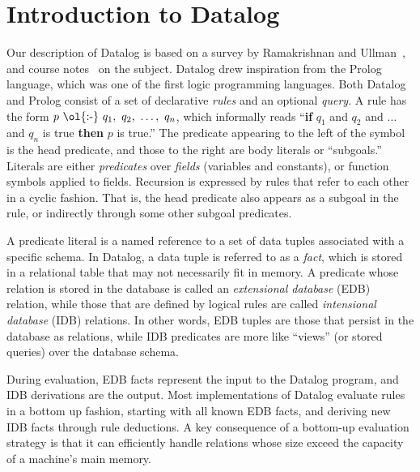 \section{Introduction to Datalog}
\label{ch:p2:sec:datalog}

Our description of Datalog is based on a survey by Ramakrishnan and
Ullman~\cite{deductive-database}, and course notes~\cite{ullmanNotes} on the
subject.  Datalog drew inspiration from the Prolog language, which was one of
the first logic programming languages.  Both Datalog and Prolog consist of a
set of declarative {\em rules} and an optional {\em query}.  A rule has the
form $p\ \text{\ol{:-}}\ q_1,\ q_2,\ \ldots,\ q_n$, which informally reads
``{\bf if} $q_1$ and $q_2$ and $\ldots$ and $q_n$ is true {\bf then} $p$ is
true.'' The predicate appearing to the left of the \ol{:-} symbol is the head
predicate, and those to the right are body literals or ``subgoals.'' Literals
are either {\em predicates} over {\em fields} (variables and constants), or
function symbols applied to fields.  Recursion is expressed by rules that refer
to each other in a cyclic fashion.  That is, the head predicate also appears as
a subgoal in the rule, or indirectly through some other subgoal predicates.

A predicate literal is a named reference to a set of data tuples associated
with a specific schema.  In Datalog, a data tuple is referred to as a {\em fact},
which is stored in a relational table that may not necessarily fit in memory.
A predicate whose relation is stored in the database is called an {\em
extensional database} (EDB) relation, while those that are defined by logical
rules are called {\em intensional database} (IDB) relations.  In other words,
EDB tuples are those that persist in the database as relations, while IDB
predicates are more like ``views'' (or stored queries) over the database
schema.

During evaluation, EDB facts represent the input to the Datalog program, and
IDB derivations are the output.  Most implementations of Datalog evaluate rules
in a bottom up fashion, starting with all known EDB facts, and deriving new IDB
facts through rule deductions.  A key consequence of a bottom-up evaluation
strategy is that it can efficiently handle relations whose size exceed the
capacity of a machine's main memory.


